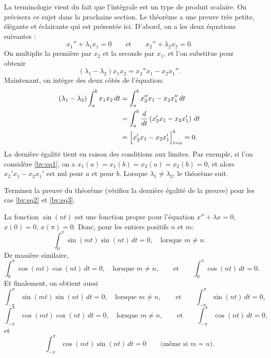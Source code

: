 La terminologie vient du fait que l'intégrale est un type de produit scalaire. On précisera ce sujet dans la prochaine section. Le théorème a une preuve  très petite, élégante et éclairante qui est présentée ici.  
D'abord, on a les deux équations suivantes : 
\begin{equation*}
x_1'' + \lambda_1 x_1 = 0
\qquad \text{et} \qquad
x_2'' + \lambda_2 x_2 = 0.
\end{equation*}
On multiplie la première par $x_2$ et la seconde par $x_1$, et l'on substitue pour obtenir 
\begin{equation*}
(\lambda_1 - \lambda_2) x_1 x_2 = x_2'' x_1 - x_2 x_1'' .
\end{equation*}
Maintenant, on intègre des deux côtés de l'équation: 
\begin{equation*}
\begin{split}
(\lambda_1 - \lambda_2) \int_a^b x_1 x_2 \,dt
& =
\int_a^b x_2'' x_1 - x_2 x_1'' \,dt \\
& =
\int_a^b \frac{d}{dt} \left( x_2' x_1 - x_2 x_1' \right) \,dt \\
& =
\Bigl[ x_2' x_1 - x_2 x_1' \Bigr]_{t=a}^b
= 0 .
\end{split}
\end{equation*}
La dernière égalité tient en raison des conditions aux limites. Par exemple, si l'on considère \eqref{bv:eq1}, on a  $x_1(a) = x_1(b) = x_2(a) = x_2(b) = 0$, et alors $x_2' x_1 - x_2 x_1'$ est nul pour $a$ et pour $b$.
Lorsque $\lambda_1 \not= \lambda_2$, le théorème suit.

\begin{exercise}[facile]
Terminez la preuve du théorème (vérifiez la dernière égalité de la preuve) pour les cas \eqref{bv:eq2} et \eqref{bv:eq3}.
\end{exercise}

La fonction $\sin (n t)$ est une fonction propre pour l'équation 
$x''+\lambda x = 0$, $x(0) = 0$, $x(\pi) = 0$. 
Donc, pour les entiers positifs $n$ et $m$:  
\begin{equation*}
\int_{0}^\pi \sin (mt) \sin (nt) \,dt = 0 ,
\quad
\text{lorsque } m \not = n.
\end{equation*}
De manière similaire,
\begin{equation*}
\int_{0}^\pi \cos (mt) \cos (nt) \,dt = 0 ,
\quad
\text{lorsque } m \not = n,
\qquad \text{et} \qquad
\int_{0}^\pi  \cos (nt) \,dt = 0 .
\end{equation*}
Et finalement, on obtient aussi
\begin{equation*}
\int_{-\pi}^\pi \sin (mt) \sin (nt) \,dt = 0 ,
\quad
\text{lorsque } m \not = n, 
\qquad \text{et} \qquad
\int_{-\pi}^\pi  \sin (nt) \,dt = 0 ,
\end{equation*}
\begin{equation*}
\int_{-\pi}^\pi \cos (mt) \cos (nt) \,dt = 0 ,
\quad
\text{lorsque } m \not = n,
\qquad \text{et} \qquad
\int_{-\pi}^\pi  \cos (nt) \,dt = 0 ,
\end{equation*}
et
\begin{equation*}
\int_{-\pi}^\pi \cos (mt) \sin (nt) \,dt = 0 
\qquad \text{(même si $m=n$).}
\end{equation*}


